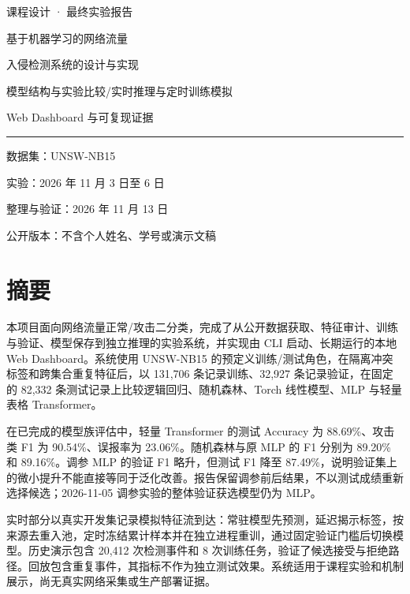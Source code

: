 \documentclass[UTF8,a4paper,11pt,fontset=fandol]{ctexart}
\begin{document}
\begin{titlepage}
\vspace*{18mm}
{\large\color{ReportBlue}课程设计 · 最终实验报告\par}
\vspace{24mm}
{\fontsize{25}{38}\selectfont 基于机器学习的网络流量\par 入侵检测系统的设计与实现\par}
\vspace{14mm}
{\large 模型结构与实验比较\quad /\quad 实时推理与定时训练模拟\par}
\vspace{5mm}
{\large Web Dashboard 与可复现证据\par}
\vfill
\noindent\rule{\textwidth}{0.5pt}
\vspace{5mm}
\noindent 数据集：UNSW-NB15\par
\noindent 实验：2026 年 11 月 3 日至 6 日\par
\noindent 整理与验证：2026 年 11 月 13 日\par
\noindent 公开版本：不含个人姓名、学号或演示文稿\par
\vspace{12mm}
\end{titlepage}
\begingroup
\small\linespread{1}\selectfont
\setlength{\parskip}{0pt}
\tableofcontents
\endgroup
\clearpage
{}
\section{摘要}\label{ux6458ux8981}

本项目面向网络流量正常/攻击二分类，完成了从公开数据获取、特征审计、训练与验证、模型保存到独立推理的实验系统，并实现由
CLI 启动、长期运行的本地 Web Dashboard。系统使用 UNSW-NB15
的预定义训练/测试角色，在隔离冲突标签和跨集合重复特征后，以 131,706
条记录训练、32,927 条记录验证，在固定的 82,332
条测试记录上比较逻辑回归、随机森林、Torch 线性模型、MLP 与轻量表格
Transformer。

在已完成的模型族评估中，轻量 Transformer 的测试 Accuracy 为
88.69\%、攻击类 F1 为 90.54\%、误报率为 23.06\%。随机森林与原 MLP 的 F1
分别为 89.20\% 和 89.16\%。调参 MLP 的验证 F1 略升，但测试 F1 降至
87.49\%，说明验证集上的微小提升不能直接等同于泛化改善。报告保留调参前后结果，不以测试成绩重新选择候选；2026-11-05
调参实验的整体验证获选模型仍为 MLP。

实时部分以真实开发集记录模拟特征流到达：常驻模型先预测，延迟揭示标签，按来源去重入池，定时冻结累计样本并在独立进程重训，通过固定验证门槛后切换模型。历史演示包含
20,412 次检测事件和 8
次训练任务，验证了候选接受与拒绝路径。回放包含重复事件，其指标不作为独立测试效果。系统适用于课程实验和机制展示，尚无真实网络采集或生产部署证据。
\end{document}
